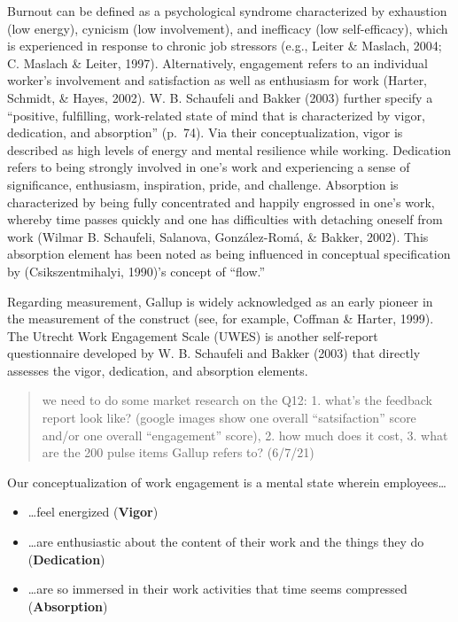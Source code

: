 \documentclass[
  english,
  man]{apa6}
\providecommand{\tightlist}{%
  \setlength{\itemsep}{0pt}\setlength{\parskip}{0pt}}
\begin{document}
Burnout can be defined as a psychological syndrome characterized by exhaustion (low energy), cynicism (low involvement), and inefficacy (low self-efficacy), which is experienced in response to chronic job stressors (e.g., Leiter \& Maslach, 2004; C. Maslach \& Leiter, 1997). Alternatively, engagement refers to an individual worker's involvement and satisfaction as well as enthusiasm for work (Harter, Schmidt, \& Hayes, 2002). W. B. Schaufeli and Bakker (2003) further specify a ``positive, fulfilling, work-related state of mind that is characterized by vigor, dedication, and absorption'' (p.~74). Via their conceptualization, vigor is described as high levels of energy and mental resilience while working. Dedication refers to being strongly involved in one's work and experiencing a sense of significance, enthusiasm, inspiration, pride, and challenge. Absorption is characterized by being fully concentrated and happily engrossed in one's work, whereby time passes quickly and one has difficulties with detaching oneself from work (Wilmar B. Schaufeli, Salanova, González-Romá, \& Bakker, 2002). This absorption element has been noted as being influenced in conceptual specification by (Csikszentmihalyi, 1990)'s concept of ``flow.''

Regarding measurement, Gallup is widely acknowledged as an early pioneer in the measurement of the construct (see, for example, Coffman \& Harter, 1999). The Utrecht Work Engagement Scale (UWES) is another self-report questionnaire developed by W. B. Schaufeli and Bakker (2003) that directly assesses the vigor, dedication, and absorption elements.

\begin{quote}
we need to do some market research on the Q12: 1. what's the feedback report look like? (google images show one overall ``satsifaction'' score and/or one overall ``engagement'' score), 2. how much does it cost, 3. what are the 200 pulse items Gallup refers to? (6/7/21)
\end{quote}

Our conceptualization of work engagement is a mental state wherein employees\ldots{}

\begin{itemize}
\tightlist
\item
  \ldots feel energized (\textbf{Vigor})
\item
  \ldots are enthusiastic about the content of their work and the things they do (\textbf{Dedication})
\item
  \ldots are so immersed in their work activities that time seems compressed (\textbf{Absorption})
\end{itemize}
\end{document}
